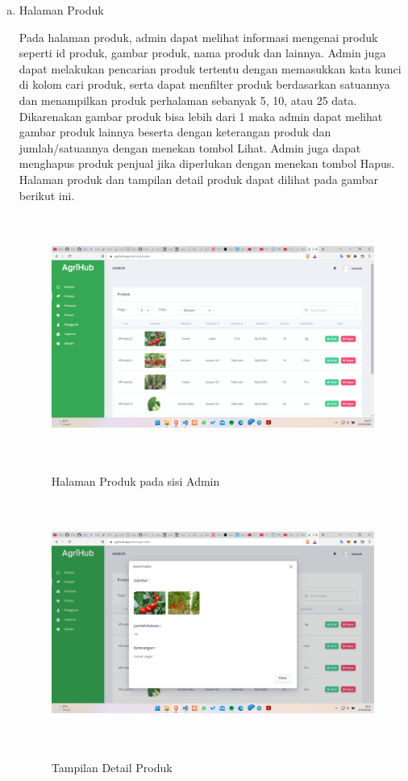 \begin{enumerate}
\begin{enumerate}[a.]
		\item Halaman Produk
		\par Pada halaman produk, admin dapat melihat informasi mengenai produk seperti id produk, gambar produk, nama produk dan lainnya. Admin juga dapat melakukan pencarian produk tertentu dengan memasukkan kata kunci di kolom cari produk, serta dapat menfilter produk berdasarkan satuannya dan menampilkan produk perhalaman sebanyak 5, 10, atau 25 data. Dikarenakan gambar produk bisa lebih dari 1 maka admin dapat melihat gambar produk lainnya beserta dengan keterangan produk dan jumlah/satuannya dengan menekan tombol Lihat. Admin juga dapat menghapus produk penjual jika diperlukan dengan menekan tombol Hapus. Halaman produk dan tampilan detail produk dapat dilihat pada gambar berikut ini.
		\begin{figure}[H]
			\centering
			{\includegraphics [width = 13.3cm, height= 8cm]{gambar/admin/produk_admin}}
			\caption{Halaman Produk pada sisi Admin}
			\label{produk_admin}
		\end{figure}
		\begin{figure}[H]
			\centering
			{\includegraphics [width = 13.3cm, height= 8cm]{gambar/admin/lihat_produk_admin}}
			\caption{Tampilan Detail Produk}
			\label{lihat_produk_admin}
		\end{figure}


\end{enumerate}
\end{enumerate}
